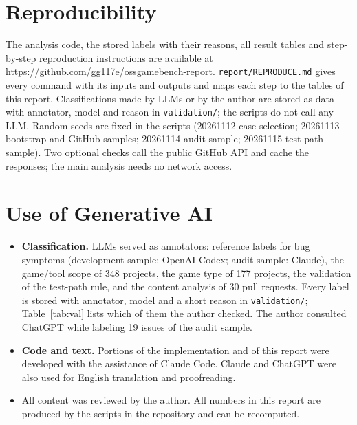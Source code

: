 \documentclass[10pt,twocolumn,a4paper]{article}
\begin{document}
\appendix
\section{Reproducibility}

The analysis code, the stored labels with their reasons, all result tables and step-by-step reproduction instructions are available at \url{https://github.com/gg117e/ossgamebench-report}.
\texttt{report/REPRODUCE.md} gives every command with its inputs and outputs and maps each step to the tables of this report.
Classifications made by LLMs or by the author are stored as data with annotator, model and reason in \texttt{validation/}; the scripts do not call any LLM.
Random seeds are fixed in the scripts (20261112 case selection; 20261113 bootstrap and GitHub samples; 20261114 audit sample; 20261115 test-path sample).
Two optional checks call the public GitHub API and cache the responses; the main analysis needs no network access.

\section{Use of Generative AI}

\begin{itemize}
\item \textbf{Classification.} LLMs served as annotators: reference labels for bug symptoms (development sample: OpenAI Codex; audit sample: Claude), the game/tool scope of 348 projects, the game type of 177 projects, the validation of the test-path rule, and the content analysis of 30 pull requests. Every label is stored with annotator, model and a short reason in \texttt{validation/}; Table~\ref{tab:val} lists which of them the author checked. The author consulted ChatGPT while labeling 19 issues of the audit sample.
\item \textbf{Code and text.} Portions of the implementation and of this report were developed with the assistance of Claude Code. Claude and ChatGPT were also used for English translation and proofreading.
\item All content was reviewed by the author. All numbers in this report are produced by the scripts in the repository and can be recomputed.
\end{itemize}
\end{document}
